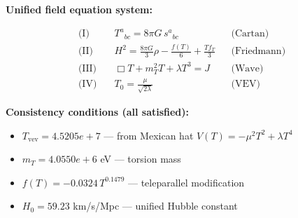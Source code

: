 
\textbf{Unified field equation system:}

\begin{align}
  \text{(I)} \quad & T^a{}_{bc} = 8\pi G \, s^a{}_{bc} && \text{(Cartan)} \\
  \text{(II)} \quad & H^2 = \frac{8\pi G}{3}\rho - \frac{f(T)}{6} + \frac{Tf_T}{3} && \text{(Friedmann)} \\
  \text{(III)} \quad & \Box T + m_T^2 T + \lambda T^3 = J && \text{(Wave)} \\
  \text{(IV)} \quad & T_0 = \frac{\mu}{\sqrt{2\lambda}} && \text{(VEV)}
\end{align}

\textbf{Consistency conditions (all satisfied):}
\begin{itemize}
  \item $T_{\text{vev}} = 4.5205e+7$ — from Mexican hat $V(T) = -\mu^2 T^2 + \lambda T^4$
  \item $m_T = 4.0550e+6$ eV — torsion mass
  \item $f(T) = -0.0324 \, T^{0.1479}$ — teleparallel modification
  \item $H_0 = 59.23$ km/s/Mpc — unified Hubble constant
\end{itemize}